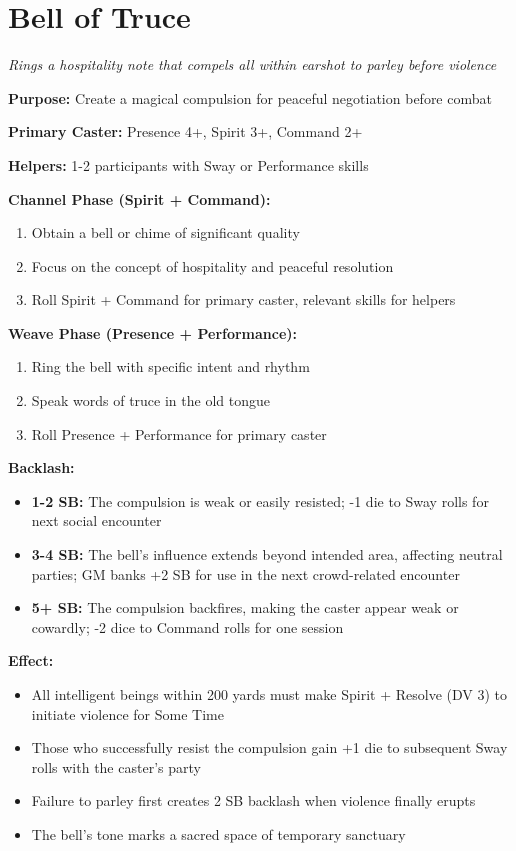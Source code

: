 \section*{Bell of Truce}
\textit{Rings a hospitality note that compels all within earshot to parley before violence}

\textbf{Purpose:} Create a magical compulsion for peaceful negotiation before combat

\textbf{Primary Caster:} Presence 4+, Spirit 3+, Command 2+

\textbf{Helpers:} 1-2 participants with Sway or Performance skills

\textbf{Channel Phase (Spirit + Command):}
\begin{enumerate}
\item Obtain a bell or chime of significant quality
\item Focus on the concept of hospitality and peaceful resolution
\item Roll Spirit + Command for primary caster, relevant skills for helpers
\end{enumerate}

\textbf{Weave Phase (Presence + Performance):}
\begin{enumerate}
\item Ring the bell with specific intent and rhythm
\item Speak words of truce in the old tongue
\item Roll Presence + Performance for primary caster
\end{enumerate}

\textbf{Backlash:}
\begin{itemize}
\item \textbf{1-2 SB:} The compulsion is weak or easily resisted; -1 die to Sway rolls for next social encounter
\item \textbf{3-4 SB:} The bell's influence extends beyond intended area, affecting neutral parties; GM banks +2 SB for use in the next crowd-related encounter
\item \textbf{5+ SB:} The compulsion backfires, making the caster appear weak or cowardly; -2 dice to Command rolls for one session
\end{itemize}

\textbf{Effect:}
\begin{itemize}
\item All intelligent beings within 200 yards must make Spirit + Resolve (DV 3) to initiate violence for Some Time
\item Those who successfully resist the compulsion gain +1 die to subsequent Sway rolls with the caster's party
\item Failure to parley first creates 2 SB backlash when violence finally erupts
\item The bell's tone marks a sacred space of temporary sanctuary
\end{itemize}

